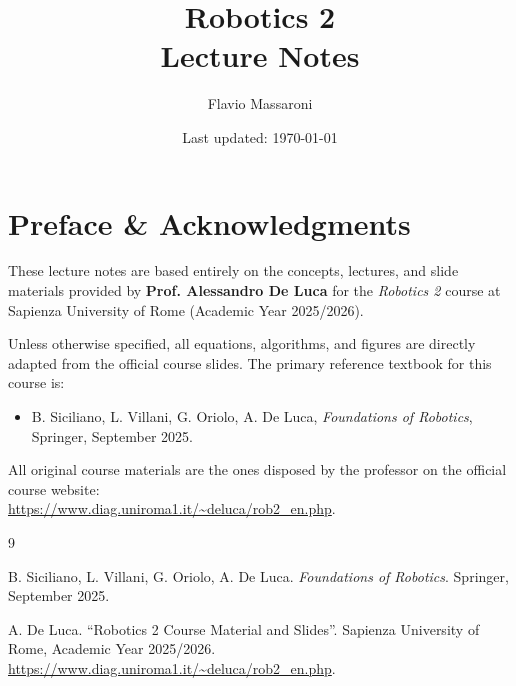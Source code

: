 \documentclass[letterpaper, 12pt]{article}
\newcommand{\1}{\mathds{1}}	%
\theoremstyle{definition}
\begin{document}

\title{Robotics 2 \\[1em]
\normalsize Lecture Notes} %


\author{\normalsize Flavio Massaroni}
\date{\normalsize\vspace{-1ex} Last updated: \today}


\maketitle
\tableofcontents\label{sec:contents}

\newpage %

\section*{Preface \& Acknowledgments}

These lecture notes are based entirely on the concepts, lectures, and slide materials provided by \textbf{Prof. Alessandro De Luca} for the \textit{Robotics 2} course at Sapienza University of Rome (Academic Year 2025/2026).

Unless otherwise specified, all equations, algorithms, and figures are directly adapted from the official course slides. The primary reference textbook for this course is:
\begin{itemize}
    \item B. Siciliano, L. Villani, G. Oriolo, A. De Luca, \textit{Foundations of Robotics}, Springer, September 2025.
\end{itemize}

All original course materials are the ones disposed by the professor on the official course website:\\
\url{https://www.diag.uniroma1.it/~deluca/rob2_en.php}.

\vspace{2em}








\begin{thebibliography}{9}

   B. Siciliano, L. Villani, G. Oriolo, A. De Luca.
   \textit{Foundations of Robotics}.
   Springer, September 2025.

   A. De Luca.
   ``Robotics 2 Course Material and Slides''.
   Sapienza University of Rome, Academic Year 2025/2026.
   \url{https://www.diag.uniroma1.it/~deluca/rob2_en.php}.

\end{thebibliography}

\end{document}
